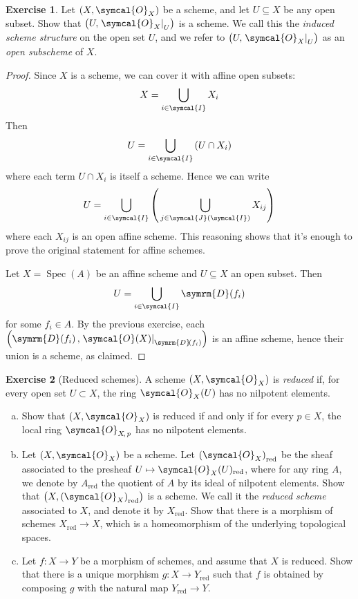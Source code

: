\documentclass[a4paper, 12pt]{article}
\theoremstyle{definition}
\newtheorem{exercise}{Exercise}
\newcommand*{\Spec}[1]{\operatorname{Spec}\left(#1\right)}
\newcommand*{\distinguished}[1]{\symrm{D}\!\left(#1\right)}
\newcommand*{\sheaf}{\symcal{O}}
\newcommand*{\ring}{\symcal{O}}
\newcommand*{\localring}[2]{\ring_{#1 \! , \, #2}}
\begin{document}
\begin{exercise}
Let \(\left(X, \sheaf_{X}\right)\) be a scheme, and let \(U \subseteq X\) be any open subset. Show that \(\left(U, \left.\sheaf_{X}\right|_U\right)\) is a scheme. We call this the \emph{induced scheme structure} on the open set \(U\), and we refer to \(\left(U, \left.\sheaf_{X}\right|_U\right)\) as an \emph{open subscheme} of \(X\).
\end{exercise}
\begin{proof}
Since \(X\) is a scheme, we can cover it with affine open subsets:
\[
    X = \bigcup_{i \in \symcal{I}} X_i
\]
Then
\[
    U = \bigcup_{i \in \symcal{I}} \left(U \cap X_i\right)
\]
where each term \(U \cap X_i\) is itself a scheme. Hence we can write
\[
    U = \bigcup_{i \in \symcal{I}} \left(\, \bigcup_{j \in \symcal{J}\left(\symcal{I}\right)} X_{i j}\right)
\]
where each \(X_{i j}\) is an open affine scheme. This reasoning shows that it's enough to prove the original statement for affine schemes.

Let \(X = \Spec{A}\) be an affine scheme and \(U \subseteq X\) an open subset. Then
\[
    U = \bigcup_{i \in \symcal{I}} \distinguished{f_i}
\]
for some \(f_i \in A\). By the previous exercise, each \(\left(\distinguished{f_i}, \left.\sheaf(X)\right|_{\distinguished{f_i}}\right)\) is an affine scheme, hence their union is a scheme, as claimed.
\end{proof}

\begin{exercise}[Reduced schemes]
A scheme \(\left(X, \sheaf_{X}\right)\) is \emph{reduced} if, for every open set \(U \subset X\), the ring \(\sheaf_X(U)\) has no nilpotent elements.
\begin{enumerate}[(a)]
    \item Show that \(\left(X, \sheaf_{X}\right)\) is reduced if and only if for every \(p \in X\), the local ring \(\localring{X}{p}\) has no nilpotent elements.
    
    \item Let \(\left(X, \sheaf_{X}\right)\) be a scheme. Let \(\left(\sheaf_{X}\right)_{\text{red}}\) be the sheaf associated to the presheaf \(U \mapsto \sheaf_{X}(U)_{\text{red}}\), where for any ring \(A\), we denote by \(A_\text{red}\) the quotient of \(A\) by its ideal of nilpotent elements. Show that \(\left(X, \left(\sheaf_X\right)_{\text{red}}\right)\) is a scheme. We call it the \emph{reduced scheme} associated to \(X\), and denote it by \(X_{\text{red}}\). Show that there is a morphism of schemes \(X_{\text{red}} \to X\), which is a homeomorphism of the underlying topological spaces.
    
    \item Let \(f \colon X \to Y\) be a morphism of schemes, and assume that \(X\) is reduced. Show that there is a unique morphism \(g \colon X \to Y_{\text{red}}\) such that \(f\) is obtained by composing \(g\) with the natural map \(Y_{\text{red}} \to Y\).
\end{enumerate}
\end{exercise}
\end{document}
